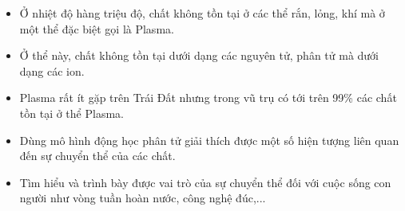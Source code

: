 \begin{emcobiet}
    \begin{itemize}
        \item Ở nhiệt độ hàng triệu độ, chất không tồn tại ở các thể rắn, lỏng, khí mà ở một thể đặc biệt gọi là Plasma.
        \item Ở thể này, chất không tồn tại dưới dạng các nguyên tử, phân tử mà dưới dạng các ion.
        \item Plasma rất ít gặp trên Trái Đất nhưng trong vũ trụ có tới trên 99\% các chất tồn tại ở thể Plasma.
    \end{itemize}
\end{emcobiet}

\begin{emcothe}
    \begin{itemize}
        \item Dùng mô hình động học phân tử giải thích được một số hiện tượng liên quan đến sự chuyển thể của các chất.
        \item Tìm hiểu và trình bày được vai trò của sự chuyển thể đối với cuộc sống con người như vòng tuần hoàn nước, công nghệ đúc,...
    \end{itemize}
\end{emcothe}
